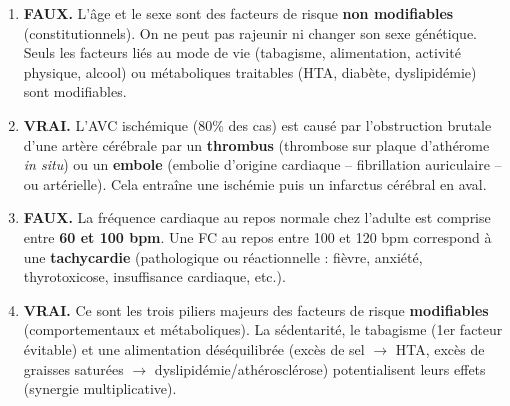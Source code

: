\documentclass[11pt]{article}
\begin{document}
\begin{corrige}
\begin{enumerate}
    \item \textbf{FAUX.} L'âge et le sexe sont des facteurs de risque \textbf{non modifiables} (constitutionnels). On ne peut pas rajeunir ni changer son sexe génétique. Seuls les facteurs liés au mode de vie (tabagisme, alimentation, activité physique, alcool) ou métaboliques traitables (HTA, diabète, dyslipidémie) sont modifiables.
    \item \textbf{VRAI.} L'AVC ischémique (80\% des cas) est causé par l'obstruction brutale d'une artère cérébrale par un \textbf{thrombus} (thrombose sur plaque d'athérome \emph{in situ}) ou un \textbf{embole} (embolie d'origine cardiaque -- fibrillation auriculaire -- ou artérielle). Cela entraîne une ischémie puis un infarctus cérébral en aval.
    \item \textbf{FAUX.} La fréquence cardiaque au repos normale chez l'adulte est comprise entre \textbf{60 et 100 bpm}. Une FC au repos entre 100 et 120 bpm correspond à une \textbf{tachycardie} (pathologique ou réactionnelle : fièvre, anxiété, thyrotoxicose, insuffisance cardiaque, etc.).
    \item \textbf{VRAI.} Ce sont les trois piliers majeurs des facteurs de risque \textbf{modifiables} (comportementaux et métaboliques). La sédentarité, le tabagisme (1er facteur évitable) et une alimentation déséquilibrée (excès de sel $\to$ HTA, excès de graisses saturées $\to$ dyslipidémie/athérosclérose) potentialisent leurs effets (synergie multiplicative).
\end{enumerate}
\end{corrige}
\end{document}
